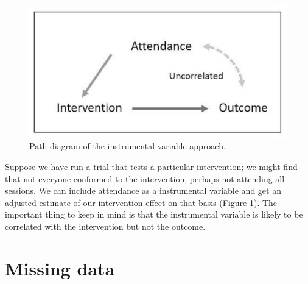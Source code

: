 \documentclass{krantz}
\begin{document}
\begin{figure}
\includegraphics[width=0.6\linewidth]{images_bw/IV1} \caption{Path diagram of the instrumental variable approach.}\label{fig:IVfig}
\end{figure}

Suppose we have run a trial that tests a particular intervention; we might find that not everyone conformed to the intervention, perhaps not attending all sessions. We can include attendance as a instrumental variable and get an adjusted estimate of our intervention effect on that basis (Figure \ref{fig:IVfig}). The important thing to keep in mind is that the instrumental variable is likely to be correlated with the intervention but not the outcome.

\hypertarget{missing-data}{%
\section{Missing data}\label{missing-data}}
\end{document}

